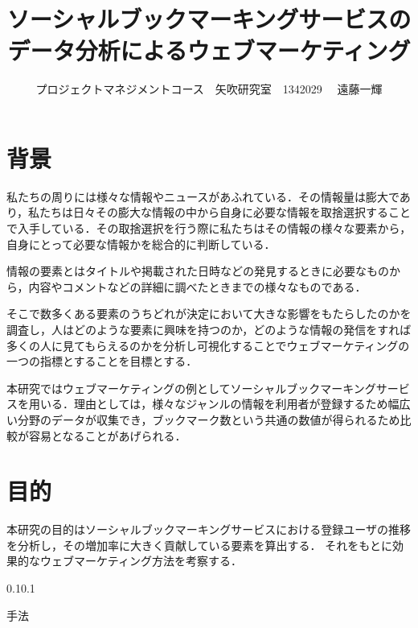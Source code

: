 \documentclass[uplatex,twocolumn,dvipdfmx]{jsarticle}
\title{\vspace{-5mm}\fontsize{14pt}{0pt}\selectfont ソーシャルブックマーキングサービスのデータ分析によるウェブマーケティング}
\author{\normalsize プロジェクトマネジメントコース　矢吹研究室　1342029 　遠藤一輝}
\date{}
\begin{document}
\fontsize{10.5pt}{\baselineskip}\selectfont
\maketitle





\section{背景}

私たちの周りには様々な情報やニュースがあふれている．その情報量は膨大であり，私たちは日々その膨大な情報の中から自身に必要な情報を取捨選択することで入手している．その取捨選択を行う際に私たちはその情報の様々な要素から，自身にとって必要な情報かを総合的に判断している\cite{yahoo}．\par
情報の要素とはタイトルや掲載された日時などの発見するときに必要なものから，内容やコメントなどの詳細に調べたときまでの様々なものである．\par
そこで数多くある要素のうちどれが決定において大きな影響をもたらしたのかを調査し，人はどのような要素に興味を持つのか，どのような情報の発信をすれば多くの人に見てもらえるのかを分析し可視化することでウェブマーケティングの一つの指標とすることを目標とする．\par
本研究ではウェブマーケティングの例としてソーシャルブックマーキングサービスを用いる．理由としては，様々なジャンルの情報を利用者が登録するため幅広い分野のデータが収集でき，ブックマーク数という共通の数値が得られるため比較が容易となることがあげられる．

\section{目的}

本研究の目的はソーシャルブックマーキングサービスにおける登録ユーザの推移を分析し，その増加率に大きく貢献している要素を算出する．
それをもとに効果的なウェブマーケティング方法を考察する．　　　　　　　　　　　　　　　　　　　　　　　　　　　　　　　　　　　　　　　　　　　

\makeatletter
  \renewcommand{\section}{%
    \@startsection{section}{1}{\z@}%
    {0.1\Cvs}{0.1\Cvs}%
    {\normalfont\large\headfont\raggedright}}
\makeatother


\section{手法}
\end{document}
